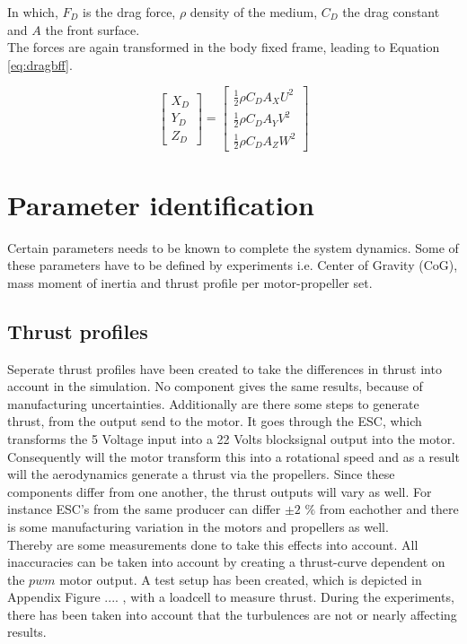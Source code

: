 In which, $F_D$ is the drag force, $\rho$ density of the medium, $C_D$ the drag constant and $A$ the front surface.\\
The forces are again transformed in the body fixed frame, leading to Equation \ref{eq:dragbff}.

\begin{equation} \label{eq:dragbff}
\begin{bmatrix}
X_D\\Y_D\\Z_D
\end{bmatrix} = 
\begin{bmatrix}
\frac{1}{2} \rho C_D A_X U^2 \\
\frac{1}{2} \rho C_D A_Y V^2 \\
\frac{1}{2} \rho C_D A_Z W^2
\end{bmatrix}
\end{equation}

\section{Parameter identification}
Certain parameters needs to be known to complete the system dynamics. Some of these parameters have to be defined by experiments i.e. Center of Gravity (CoG), mass moment of inertia and thrust profile per motor-propeller set. 

\subsection{Thrust profiles}
Seperate thrust profiles have been created to take the differences in thrust into account in the simulation. No component gives the same results, because of manufacturing uncertainties. Additionally are there some steps to generate thrust, from the output send to the motor. It goes through the ESC, which transforms the 5 Voltage input into a 22 Volts blocksignal output into the motor. Consequently will the motor transform this into a rotational speed and as a result will the aerodynamics generate a thrust via the propellers. Since these components differ from one another, the thrust outputs will vary as well. For instance ESC's from the same producer can differ $\pm 2$ $\%$ from eachother and there is some manufacturing variation in the motors and propellers as well.\\
Thereby are some measurements done to take this effects into account. All inaccuracies can be taken into account by creating a thrust-curve dependent on the $pwm$ motor output. A test setup has been created, which is depicted in Appendix Figure .... , with a loadcell to measure thrust. During the experiments, there has been taken into account that the turbulences are not or nearly affecting results.\\

